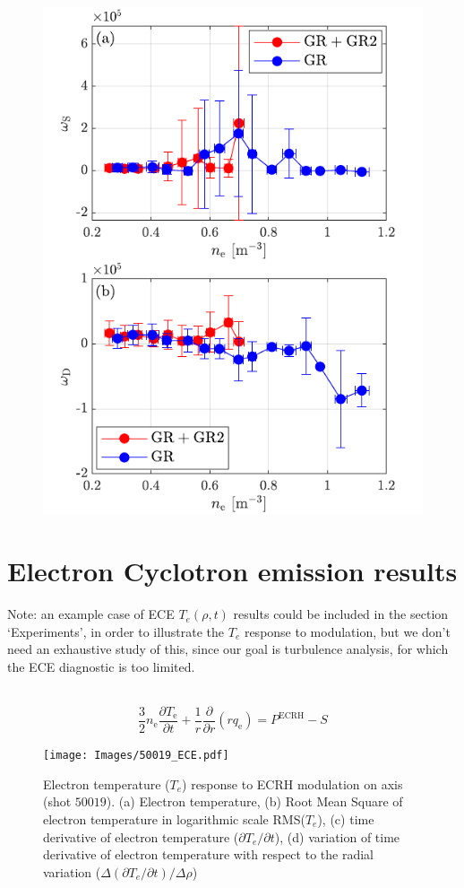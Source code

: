 \documentclass[preprint,12pt,authoryear]{elsarticle}
\begin{document}
\begin{figure}[!ht]

   \includegraphics[width=0.5\columnwidth]{Images/transition_5.pdf}
   \caption{}
   \label{Fig:transition_5}
\end{figure}


\section{Electron Cyclotron emission results}

Note: an example case of ECE $T_e(\rho,t)$ results could be included in the section `Experiments', in order to illustrate the $T_e$ response to modulation, but we don't need an exhaustive study of this, since our goal is turbulence analysis, for which the ECE diagnostic is too limited.

~\protect\cite{S_Eguilior_2003}
\begin{equation}
    \frac{3}{2}n_\mathrm{e}\frac{\partial T_\mathrm{e}}{\partial t} + \frac{1}{r}\frac{\partial }{\partial r}(r q_\mathrm{e}) = P^\mathrm{ECRH} - S
    \label{Eq.Transport_1}
\end{equation}

\begin{figure}[!ht]
   \texttt{[image: Images/50019\_ECE.pdf]}
   \caption{Electron temperature ($T_e$) response to ECRH modulation on axis (shot $50019$). (a) Electron temperature, (b) Root Mean Square of electron temperature in logarithmic scale RMS($T_e$), (c) time derivative of electron temperature ($\partial T_e /\partial t $), (d) variation of time derivative of electron temperature with respect to the radial variation ($\Delta(\partial T_e /\partial t)/\Delta \rho $)}
   \label{Fig:50019_ECE}
\end{figure}
\end{document}
